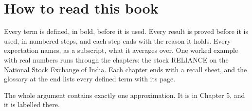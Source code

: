 \section*{How to read this book}
Every term is defined, in bold, before it is used. Every result is proved before it is used, in numbered steps, and each step ends with the reason it holds. Every expectation names, as a subscript, what it averages over. One worked example with real numbers runs through the chapters: the stock RELIANCE on the National Stock Exchange of India. Each chapter ends with a recall sheet, and the glossary at the end lists every defined term with its page.

The whole argument contains exactly one approximation. It is in Chapter 5, and it is labelled there.
